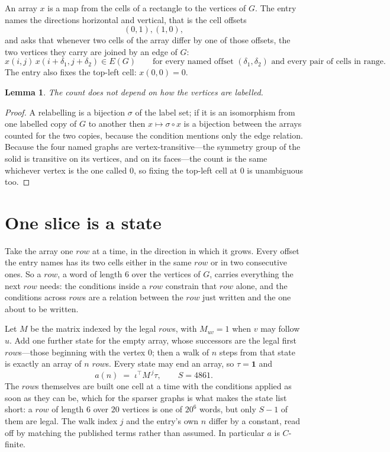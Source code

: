 \documentclass[11pt,a4paper]{article}
\theoremstyle{plain}
\newtheorem{lemma}[theorem]{Lemma}
\theoremstyle{definition}
\begin{document}
An array $x$ is a map from the cells of a rectangle to the vertices of $G$. The entry names the
directions horizontal and vertical, that is the cell offsets
\[
(0,1), (1,0),
\]
and asks that whenever two cells of the array differ by one of those offsets, the two vertices
they carry are joined by an edge of $G$:
\[
x(i,j)\,x(i+\delta_1,j+\delta_2)\in E(G)\qquad
\text{for every named offset } (\delta_1,\delta_2)\text{ and every pair of cells in range.}
\]
The entry also fixes the top-left cell: $x(0,0)=0$.

\begin{lemma}\label{lem:label}
The count does not depend on how the vertices are labelled.
\end{lemma}

\begin{proof}
A relabelling is a bijection $\sigma$ of the label set; if it is an isomorphism from one
labelled copy of $G$ to another then $x\mapsto\sigma\circ x$ is a bijection between the arrays
counted for the two copies, because the condition mentions only the edge relation.
Because the four named graphs are vertex-transitive---the symmetry group of the solid is transitive on its vertices, and on its faces---the count is the same whichever vertex is the one called $0$, so fixing the top-left cell at $0$ is unambiguous too.
\end{proof}

\section{One slice is a state}

Take the array one $row$ at a time, in the direction in which it grows.
Every offset the entry names has its two cells either in the same $row$ or in two
consecutive ones. So a $row$, a word of length $6$ over the vertices of $G$, carries
everything the next $row$ needs: the conditions inside a $row$ constrain that
$row$ alone, and the conditions across $row$s are a relation between the
$row$ just written and the one about to be written.

Let $M$ be the matrix indexed by the legal $row$s, with $M_{uv}=1$ when $v$ may
follow $u$. Add one further state for the empty array, whose successors are the legal first
$row$s---those beginning with the vertex $0$; then a walk of
$n$ steps from that state is exactly an array of $n$ $row$s. Every state may end an
array, so $\tau=\mathbf{1}$ and
\[
a(n)\;=\;\iota^{\!\top}M^{\,j}\tau ,\qquad S=4861.
\]
The $row$s themselves are built one cell at a time with the conditions applied as soon
as they can be, which for the sparser graphs is what makes the state list short: a $row$
of length $6$ over $20$ vertices is one of $20^{6}$ words, but only $S-1$ of them are
legal. The walk index $j$ and the entry's own $n$ differ by a constant, read off by matching the
published terms rather than assumed. In particular $a$ is $C$-finite.
\end{document}
